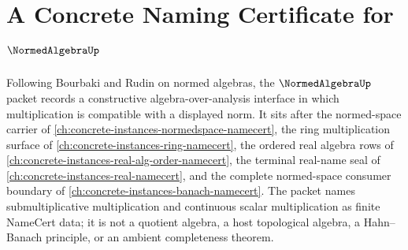 \chapter{A Concrete Naming Certificate for $\NormedAlgebraUp$}
\label{ch:concrete-instances-normed-algebra-namecert}

Following Bourbaki and Rudin on normed algebras, the $\NormedAlgebraUp$ packet records a constructive algebra-over-analysis interface in which multiplication is compatible with a displayed norm. It sits after the normed-space carrier of \autoref{ch:concrete-instances-normedspace-namecert}, the ring multiplication surface of \autoref{ch:concrete-instances-ring-namecert}, the ordered real algebra rows of \autoref{ch:concrete-instances-real-alg-order-namecert}, the terminal real-name seal of \autoref{ch:concrete-instances-real-namecert}, and the complete normed-space consumer boundary of \autoref{ch:concrete-instances-banach-namecert}. The packet names submultiplicative multiplication and continuous scalar multiplication as finite NameCert data; it is not a quotient algebra, a host topological algebra, a Hahn--Banach principle, or an ambient completeness theorem.

